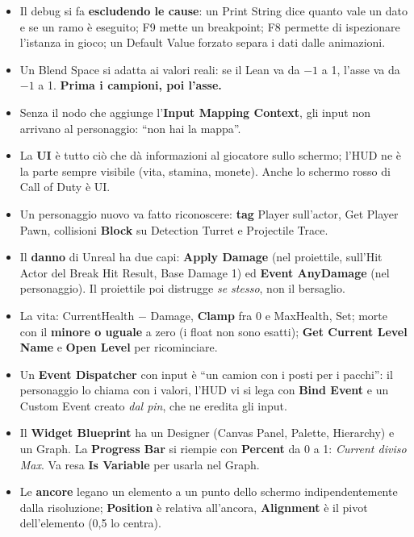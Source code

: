 \begin{itemize}
  \item Il debug si fa \textbf{escludendo le cause}: un Print String dice quanto vale un
        dato e se un ramo è eseguito; F9 mette un breakpoint; F8 permette di ispezionare
        l'istanza in gioco; un Default Value forzato separa i dati dalle animazioni.
  \item Un Blend Space si adatta ai valori reali: se il Lean va da $-1$ a 1, l'asse va da
        $-1$ a 1. \textbf{Prima i campioni, poi l'asse.}
  \item Senza il nodo che aggiunge l'\textbf{Input Mapping Context}, gli input non
        arrivano al personaggio: ``non hai la mappa''.
  \item La \textbf{UI} è tutto ciò che dà informazioni al giocatore sullo schermo; l'HUD
        ne è la parte sempre visibile (vita, stamina, monete). Anche lo schermo rosso di
        Call of Duty è UI.
  \item Un personaggio nuovo va fatto riconoscere: \textbf{tag} Player sull'actor, Get
        Player Pawn, collisioni \textbf{Block} su Detection Turret e Projectile Trace.
  \item Il \textbf{danno} di Unreal ha due capi: \textbf{Apply Damage} (nel proiettile,
        sull'Hit Actor del Break Hit Result, Base Damage 1) ed \textbf{Event AnyDamage}
        (nel personaggio). Il proiettile poi distrugge \emph{se stesso}, non il bersaglio.
  \item La vita: CurrentHealth $-$ Damage, \textbf{Clamp} fra 0 e MaxHealth, Set; morte
        con il \textbf{minore o uguale} a zero (i float non sono esatti); \textbf{Get
        Current Level Name} e \textbf{Open Level} per ricominciare.
  \item Un \textbf{Event Dispatcher} con input è ``un camion con i posti per i pacchi'':
        il personaggio lo chiama con i valori, l'HUD vi si lega con \textbf{Bind Event} e
        un Custom Event creato \emph{dal pin}, che ne eredita gli input.
  \item Il \textbf{Widget Blueprint} ha un Designer (Canvas Panel, Palette, Hierarchy) e
        un Graph. La \textbf{Progress Bar} si riempie con \textbf{Percent} da 0 a 1:
        \emph{Current diviso Max}. Va resa \textbf{Is Variable} per usarla nel Graph.
  \item Le \textbf{ancore} legano un elemento a un punto dello schermo indipendentemente
        dalla risoluzione; \textbf{Position} è relativa all'ancora, \textbf{Alignment} è il
        pivot dell'elemento (0,5 lo centra).

\end{itemize}
